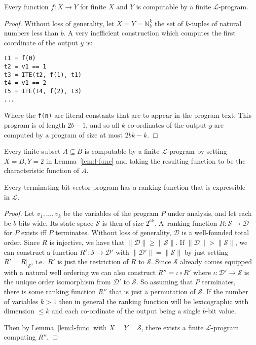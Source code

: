 \documentclass[a4paper]{llncs}
\begin{document}
\begin{lemma}
 \label{lem:l-func}
 Every function $f: X \to Y$ for finite $X$ and $Y$ is computable by a finite $\mathcal{L}$-program.
\end{lemma}

\begin{proof}
Without loss of generality, let $X = Y = \mathbb{N}_b^k$ the set of
$k$-tuples of natural numbers less than $b$.
A very inefficient construction which computes the first coordinate
of the output $y$ is:
%
\begin{verbatim}
t1 = f(0)
t2 = v1 == 1
t3 = ITE(t2, f(1), t1)
t4 = v1 == 2
t5 = ITE(t4, f(2), t3)
...
\end{verbatim}
%
Where the \verb|f(n)| are literal constants that are to appear in the program text.
This program is of length $2b - 1$, and so all $k$ co-ordinates of the output $y$
are computed by a program of size at most $2bk - k$.
\end{proof}

\begin{corollary}
 Every finite subset $A \subseteq B$ is computable by a finite $\mathcal{L}$-program
 by setting $X = B, Y = 2$ in Lemma~\ref{lem:l-func} and taking the
 resulting function to be the characteristic function of $A$.
\end{corollary}

\begin{theorem}
\label{thm:l-term}
 Every terminating bit-vector program has a ranking function that is expressible in $\mathcal{L}$.
\end{theorem}

\begin{proof}
%
Let $v_1, \ldots, v_k$ be the variables of the program $P$ under analysis,
and let each be $b$ bits wide.  Its state space $\mathcal{S}$ is then of
size $2^{bk}$.  A~ranking function $R: \mathcal{S} \to \mathcal{D}$ for $P$
exists iff $P$ terminates.  Without loss of generality,
$\mathcal{D}$ is a well-founded total order.  Since $R$ is injective, we have that $\|
\mathcal{D} \| \geq \| \mathcal{S} \|$.  If $\| \mathcal{D} \| > \|
\mathcal{S} \|$, we can construct a function $R': \mathcal{S} \to
\mathcal{D'}$ with $ \| \mathcal{D'} \| = \| \mathcal{S} \|$ by just setting
$R' = R|_\mathcal{S}$, i.e.~$R'$ is just the restriction of $R$ to
$\mathcal{S}$.  Since $\mathcal{S}$ already comes equipped with a natural
well ordering we can also construct $R'' = \iota \circ R'$ where $\iota:
\mathcal{D'} \to \mathcal{S}$ is the unique order isomorphism from
$\mathcal{D'}$ to $\mathcal{S}$.  So assuming that $P$ terminates, there is
some ranking function $R''$ that is just a permutation of $\mathcal{S}$.  If
the number of variables $k > 1$ then in general the ranking function will be
lexicographic with dimension $\leq k$ and each co-ordinate of the output
being a single $b$-bit value.

Then by Lemma~\ref{lem:l-func} with $X = Y = \mathcal{S}$, there exists
a finite $\mathcal{L}$-program computing $R''$.
\end{proof}
\end{document}
